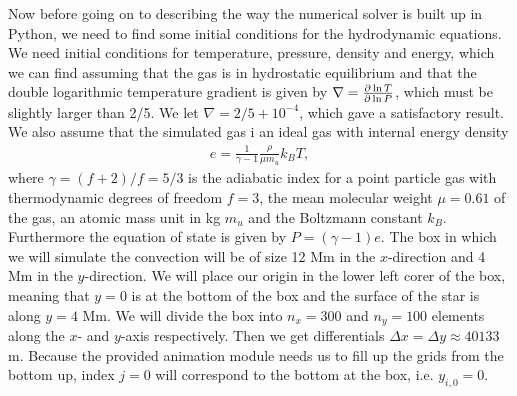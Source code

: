 \documentclass{emulateapj}
\begin{document}
	Now before going on to describing the way the numerical solver is built up in Python, we need to find some initial conditions for the hydrodynamic equations. We need initial conditions for temperature, pressure, density and energy, which we can find assuming that the gas is in hydrostatic equilibrium and that the double logarithmic temperature gradient is given by $\nabla = \pdv{\ln T}{\ln P}$, which must be slightly larger than 2/5. We let $\nabla = 2/5 + 10^{-4}$, which gave a satisfactory result. We also assume that the simulated gas i an ideal gas with internal energy density 
	\begin{align}
		e = \frac{1}{\gamma - 1} \frac{\rho}{\mu m_u}k_B T,
		\label{eq:internal energy}
	\end{align} 
	where $\gamma = (f + 2)/f = 5/3$ is the adiabatic index for a point particle gas with thermodynamic degrees of freedom $f=3$, the mean molecular weight $\mu = 0.61$ of the gas, an atomic mass unit in kg $m_u$ and the Boltzmann constant $k_B$. Furthermore the equation of state is given by $P = (\gamma - 1)e$. The box in which we will simulate the convection will be of size 12 Mm in the $x$-direction and 4 Mm in the $y$-direction. We will place our origin in the lower left corer of the box, meaning that $y = 0$ is at the bottom of the box and the surface of the star is along $y = 4$ Mm. We will divide the box into $n_x = 300$ and $n_y = 100$ elements along the $x$- and $y$-axis respectively. Then we get differentials $\Delta x =\Delta y \approx 40133$ m. Because the provided animation module needs us to fill up the grids from the bottom up, index $j = 0$ will correspond to the bottom at the box, i.e. $y_{i, 0} = 0$. 
	
\end{document}
